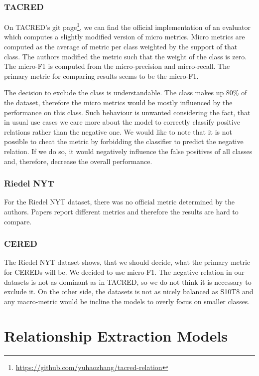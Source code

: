 \subsubsection{TACRED}
On TACRED's git page\footnote{\url{https://github.com/yuhaozhang/tacred-relation}}, we can find the official implementation of an evaluator which computes a slightly modified version of micro metrics. Micro metrics are computed as the average of metric per class weighted by the support of that class. The authors modified the metric such that the weight of the  class is zero. The micro-F1 is computed from the micro-precision and micro-recall. The primary metric for comparing results seems to be the micro-F1.

The decision to exclude the  class is understandable. The class makes up 80\% of the dataset, therefore the micro metrics would be mostly influenced by the performance on this class. Such behaviour is unwanted considering the fact, that in usual use cases we care more about the model to correctly classify positive relations rather than the negative one. We would like to note that it is not possible to cheat the metric by forbidding the classifier to predict the negative relation. If we do so, it would negatively influence the false positives of all classes and, therefore, decrease the overall performance.


\subsubsection{Riedel NYT}

For the Riedel NYT dataset, there was no official metric determined by the authors. Papers report different metrics and therefore the results are hard to compare.


\subsubsection{CERED}

The Riedel NYT dataset shows, that we should decide, what the primary metric for CEREDs will be. We decided to use micro-F1. The negative relation in our datasets is not as dominant as in TACRED, so we do not think it is necessary to exclude it. On the other side, the datasets is not as nicely balanced as S10T8 and any macro-metric would be incline the models to overly focus on smaller classes.




\section{Relationship Extraction Models}



